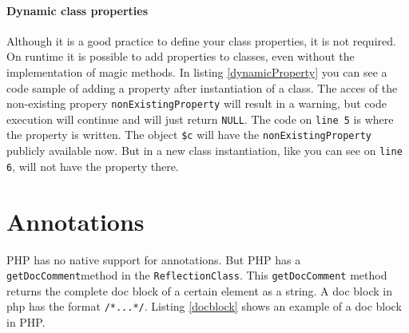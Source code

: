 \documentclass[../main.tex]{subfiles}
\begin{document}
    \paragraph{Dynamic class properties}
    Although it is a good practice to define your class properties, it is not required.
    On runtime it is possible to add properties to classes, even without the implementation of magic methods.
    In listing \ref{dynamicProperty} you can see a code sample of adding a property after instantiation of a class.
    The acces of the non-existing propery \texttt{nonExistingProperty} will result in a warning, but code execution will continue and will just return \texttt{NULL}.
    The code on \texttt{line 5} is where the property is written.
    The object \texttt{\$c} will have the \texttt{nonExistingProperty} publicly available now.
    But in a new class instantiation, like you can see on \texttt{line 6}, will not have the property there.
    
    
    
    \section{Annotations}
    PHP has no native support for annotations.
    But PHP has a \texttt{getDocComment}\footnotemark method in the \texttt{ReflectionClass}. 
    This \texttt{getDocComment} method returns the complete doc block of a certain element as a string.
    A doc block in php has the format \texttt{\slash**...*\slash}.
    Listing \ref{docblock} shows an example of a doc block in PHP.
    
    
\end{document}
